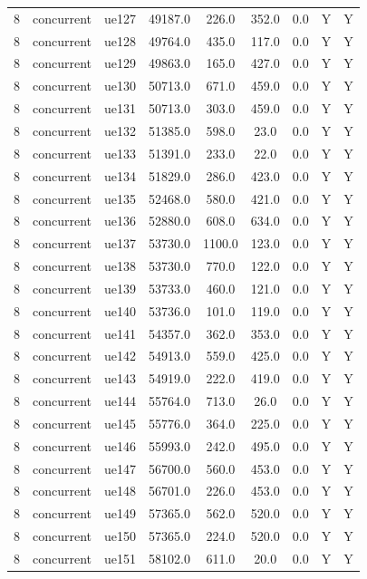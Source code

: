 \begin{table}[ht]
\begin{tabular}{|c|c|c|c|c|c|c|c|c|}
8 & concurrent & ue127 & 49187.0 & 226.0 & 352.0 & 0.0 & Y & Y \\
8 & concurrent & ue128 & 49764.0 & 435.0 & 117.0 & 0.0 & Y & Y \\
8 & concurrent & ue129 & 49863.0 & 165.0 & 427.0 & 0.0 & Y & Y \\
8 & concurrent & ue130 & 50713.0 & 671.0 & 459.0 & 0.0 & Y & Y \\
8 & concurrent & ue131 & 50713.0 & 303.0 & 459.0 & 0.0 & Y & Y \\
8 & concurrent & ue132 & 51385.0 & 598.0 & 23.0 & 0.0 & Y & Y \\
8 & concurrent & ue133 & 51391.0 & 233.0 & 22.0 & 0.0 & Y & Y \\
8 & concurrent & ue134 & 51829.0 & 286.0 & 423.0 & 0.0 & Y & Y \\
8 & concurrent & ue135 & 52468.0 & 580.0 & 421.0 & 0.0 & Y & Y \\
8 & concurrent & ue136 & 52880.0 & 608.0 & 634.0 & 0.0 & Y & Y \\
8 & concurrent & ue137 & 53730.0 & 1100.0 & 123.0 & 0.0 & Y & Y \\
8 & concurrent & ue138 & 53730.0 & 770.0 & 122.0 & 0.0 & Y & Y \\
8 & concurrent & ue139 & 53733.0 & 460.0 & 121.0 & 0.0 & Y & Y \\
8 & concurrent & ue140 & 53736.0 & 101.0 & 119.0 & 0.0 & Y & Y \\
8 & concurrent & ue141 & 54357.0 & 362.0 & 353.0 & 0.0 & Y & Y \\
8 & concurrent & ue142 & 54913.0 & 559.0 & 425.0 & 0.0 & Y & Y \\
8 & concurrent & ue143 & 54919.0 & 222.0 & 419.0 & 0.0 & Y & Y \\
8 & concurrent & ue144 & 55764.0 & 713.0 & 26.0 & 0.0 & Y & Y \\
8 & concurrent & ue145 & 55776.0 & 364.0 & 225.0 & 0.0 & Y & Y \\
8 & concurrent & ue146 & 55993.0 & 242.0 & 495.0 & 0.0 & Y & Y \\
8 & concurrent & ue147 & 56700.0 & 560.0 & 453.0 & 0.0 & Y & Y \\
8 & concurrent & ue148 & 56701.0 & 226.0 & 453.0 & 0.0 & Y & Y \\
8 & concurrent & ue149 & 57365.0 & 562.0 & 520.0 & 0.0 & Y & Y \\
8 & concurrent & ue150 & 57365.0 & 224.0 & 520.0 & 0.0 & Y & Y \\
8 & concurrent & ue151 & 58102.0 & 611.0 & 20.0 & 0.0 & Y & Y \\

\end{tabular}
\end{table}
